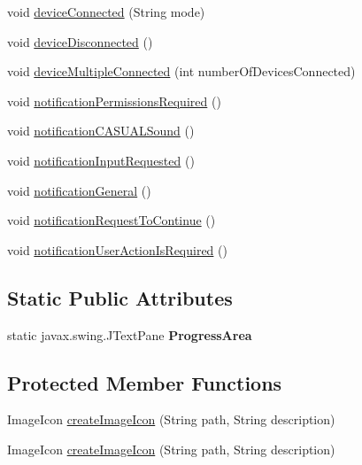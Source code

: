 \begin{DoxyCompactItemize}
\item 
void \hyperlink{classGUI_1_1development_1_1CASUALJFrameMain_aacdbe72ec60c691bc5606c3893a52f7d}{device\-Connected} (String mode)
\item 
void \hyperlink{classGUI_1_1development_1_1CASUALJFrameMain_abd52217ac3134fd45343dd6838601f38}{device\-Disconnected} ()
\item 
void \hyperlink{classGUI_1_1development_1_1CASUALJFrameMain_a0bc8b9c2ca823527932c53d869174e90}{device\-Multiple\-Connected} (int number\-Of\-Devices\-Connected)
\item 
void \hyperlink{classGUI_1_1development_1_1CASUALJFrameMain_a798bd91756d5c27d6f5017a8025b4130}{notification\-Permissions\-Required} ()
\item 
void \hyperlink{classGUI_1_1development_1_1CASUALJFrameMain_a4450abb55d30b94308914af44ef4ee98}{notification\-C\-A\-S\-U\-A\-L\-Sound} ()
\item 
void \hyperlink{classGUI_1_1development_1_1CASUALJFrameMain_a34444561be5204262b95aa6001c4aac1}{notification\-Input\-Requested} ()
\item 
void \hyperlink{classGUI_1_1development_1_1CASUALJFrameMain_a1fe1b03a2ad5aa30c5c8fe208813d4f6}{notification\-General} ()
\item 
void \hyperlink{classGUI_1_1development_1_1CASUALJFrameMain_ad90ba0f96765dfa612ccb92cccecbe98}{notification\-Request\-To\-Continue} ()
\item 
void \hyperlink{classGUI_1_1development_1_1CASUALJFrameMain_a442ecb84833fd7e90fbe97fcb3feb1e7}{notification\-User\-Action\-Is\-Required} ()
\end{DoxyCompactItemize}
\subsection*{Static Public Attributes}
\begin{DoxyCompactItemize}
\item 
\hypertarget{classGUI_1_1development_1_1CASUALJFrameMain_a72d64498ea091c25c674d3d6630875c2}{static javax.\-swing.\-J\-Text\-Pane {\bfseries Progress\-Area}}\label{classGUI_1_1development_1_1CASUALJFrameMain_a72d64498ea091c25c674d3d6630875c2}

\end{DoxyCompactItemize}
\subsection*{Protected Member Functions}
\begin{DoxyCompactItemize}
\item 
Image\-Icon \hyperlink{classGUI_1_1development_1_1CASUALJFrameMain_a77e9e48b60846af1afd1c3ba9867721d}{create\-Image\-Icon} (String path, String description)
\item 
Image\-Icon \hyperlink{classGUI_1_1development_1_1CASUALJFrameMain_a77e9e48b60846af1afd1c3ba9867721d}{create\-Image\-Icon} (String path, String description)
\end{DoxyCompactItemize}


